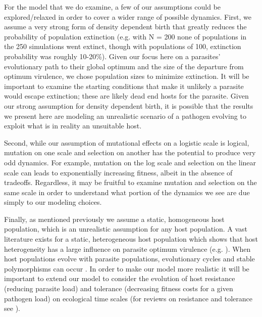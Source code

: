 For the model that we do examine, a few of our assumptions could be explored/relaxed in order to cover a wider range of possible dynamics. First, we assume a very strong form of density dependent birth that greatly reduces the probability of population extinction (e.g. with N = 200 none of populations in the 250 simulations went extinct, though with populations of 100, extinction probability was roughly 10-20\%). Given our focus here on a parasites' evolutionary path to their global optimum and the size of the departure from optimum virulence, we chose population sizes to minimize extinction. It will be important to examine the starting conditions that make it unlikely a parasite would escape extinction; these are likely dead end hosts for the parasite. Given our strong assumption for density dependent birth, it is possible that the results we present here are modeling an unrealistic scenario of a pathogen evolving to exploit what is in reality an unsuitable host.

Second, while our assumption of mutational effects on a logistic scale is logical, mutation on one scale and selection on another has the potential to produce very odd dynamics. For example, mutation on the log scale and selection on the linear scale can leads to exponentially increasing fitness, albeit in the absence of tradeoffs. Regardless, it may be fruitful to examine mutation and selection on the same scale in order to understand what portion of the dynamics we see are due simply to our modeling choices. 

Finally, as mentioned previously we assume a static, homogeneous host population, which is an unrealistic assumption for any host population. A vast literature exists for a static, heterogeneous host population which shows that host heterogeneity has a large influence on parasite optimum virulence (e.g. \citep{EbertandHamilton1996, Gandonetal.2001, Ganusovetal.2002, Gandon2004, Kainetal.2018}). When host populations evolve with parasite populations, evolutionary cycles and stable polymorphisms can occur \citep{CarvalandFerriere2010, Bestetal.2014, Athanasiadouetal.2015}. In order to make our model more realistic it will be important to extend our model to consider the evolution of host resistance (reducing parasite load) and tolerance (decreasing fitness costs for a given pathogen load) on ecological time scales (for reviews on resistance and tolerance see \citealt{SchneiderandAyres2008, AyresandSchneider2012, KutzerandArmitage2016}). 

